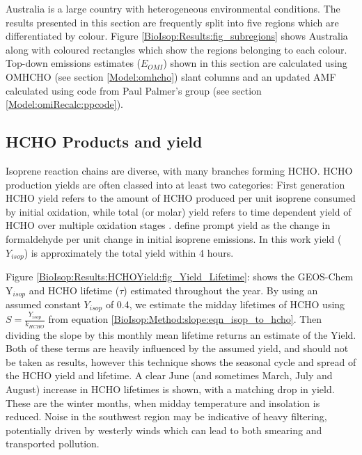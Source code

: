   Australia is a large country with heterogeneous environmental conditions.
  The results presented in this section are frequently split into five regions which are differentiated by colour.
  Figure \ref{BioIsop:Results:fig_subregions} shows Australia along with coloured rectangles which show the regions belonging to each colour.
  Top-down emissions estimates ($E_{OMI}$) shown in this section are calculated using OMHCHO (see section \ref{Model:omhcho}) slant columns and an updated AMF calculated using code from Paul Palmer's group (see section \ref{Model:omiRecalc:ppcode}). 
  
  
  \subsection{HCHO Products and yield}
    \label{BioIsop:Results:HCHOYield}
    
    Isoprene reaction chains are diverse, with many branches forming HCHO.
    HCHO production yields are often classed into at least two categories: First generation HCHO yield refers to the amount of HCHO produced per unit isoprene consumed by initial oxidation, while total (or molar) yield refers to time dependent yield of HCHO over multiple oxidation stages \parencite{Wolfe2016}.
    \textcite{Wolfe2016} define prompt yield as the change in formaldehyde per unit change in initial isoprene emissions.
    In this work yield ($Y_{isop}$) is approximately the total yield within 4 hours.
    
    Figure \ref{BioIsop:Results:HCHOYield:fig_Yield_Lifetime}: shows the GEOS-Chem Y$_{isop}$ and HCHO lifetime ($\tau$) estimated throughout the year.
    By using an assumed constant $Y_{isop}$ of 0.4, we estimate the midday lifetimes of HCHO using $S = \frac{Y_{isop}}{k_{HCHO}}$ from equation \ref{BioIsop:Method:slope:eqn_isop_to_hcho}.
    Then dividing the slope by this monthly mean lifetime returns an estimate of the Yield.
    Both of these terms are heavily influenced by the assumed yield, and should not be taken as results, however this technique shows the seasonal cycle and spread of the HCHO yield and lifetime.
    A clear June (and sometimes March, July and August) increase in HCHO lifetimes is shown, with a matching drop in yield. 
    These are the winter months, when midday temperature and insolation is reduced.
    Noise in the southwest region may be indicative of heavy filtering, potentially driven by westerly winds which can lead to both smearing and transported pollution.
    
